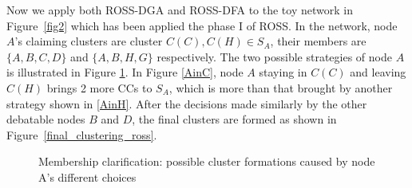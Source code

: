 \documentclass[times]{ettauth}
\theoremstyle{mytheoremstyle}
\theoremstyle{mytheoremstyle}
\theoremstyle{mytheoremstyle}
\begin{document}
Now we apply both ROSS-DGA and ROSS-DFA to the toy network in Figure~\ref{fig2} which has been applied the phase I of ROSS.
In the network, node $A$'s claiming clusters are cluster $C(C), C(H)\in S_A$, their members are $\{A,B,C,D\}$ and $\{A,B,H,G\}$ respectively. 
The two possible strategies of node $A$ is illustrated in Figure \ref{fig3}.
In Figure \ref{AinC}, node $A$ staying in $C(C)$ and leaving $C(H)$ brings 2 more CCs to $S_A$, which is more than that brought by another strategy shown in \ref{AinH}.
After the decisions made similarly by the other debatable nodes $B$ and $D$, the final clusters are formed as shown in Figure~\ref{final_clustering_ross}.



\begin{figure}[h]
\centering
{}
\hspace{.15 in}
\caption[]{Membership clarification: possible cluster formations caused by node A's different choices} %
\label{fig3}
\end{figure}
\end{document}
